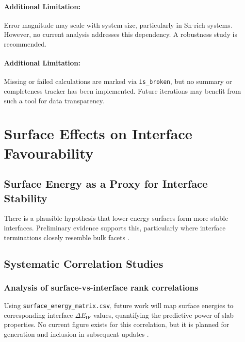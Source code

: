 
\paragraph{Additional Limitation:}

Error magnitude may scale with system size, particularly in Sn-rich systems. However, no current analysis addresses this dependency. A robustness study is recommended.


\paragraph{Additional Limitation:}

Missing or failed calculations are marked via \texttt{is\_broken}, but no summary or completeness tracker has been implemented. Future iterations may benefit from such a tool for data transparency.

\section{Surface Effects on Interface Favourability}

\label{section:surface_effects}

\subsection{Surface Energy as a Proxy for Interface Stability}

There is a plausible hypothesis that lower-energy surfaces form more stable interfaces. Preliminary evidence supports this, particularly where interface terminations closely resemble bulk facets .

\subsection{Systematic Correlation Studies}

\subsubsection{Analysis of surface-vs-interface rank correlations}

Using \texttt{surface\_energy\_matrix.csv}, future work will map surface energies to corresponding interface $\Delta E_\mathrm{IF}$ values, quantifying the predictive power of slab properties. No current figure exists for this correlation, but it is planned for generation and inclusion in subsequent updates .

